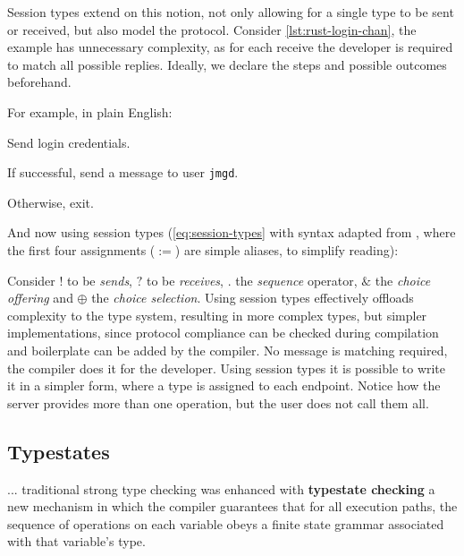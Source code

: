 

Session types extend on this notion, not only allowing for a single type to be sent or received,
but also model the protocol.
Consider \autoref{lst:rust-login-chan}, the example has unnecessary complexity,
as for each receive the developer is required to match all possible replies.
Ideally, we declare the steps and possible outcomes beforehand.

For example, in plain English:
\begin{compactenum}
    \item Send login credentials.
    \item If successful, send a message to user \texttt{jmgd}.
    \item Otherwise, exit.
\end{compactenum}

And now using session types (\autoref{eq:session-types}
with syntax adapted from \autocite{Vasconcelos2006},
where the first four assignments ($:=$) are simple aliases, to simplify reading):



Consider $!$ to be \emph{sends}, $?$ to be \emph{receives}, $.$ the \emph{sequence} operator,
$\&$ the \emph{choice offering} and $\oplus$ the \emph{choice selection}.
Using session types effectively offloads complexity to the type system,
resulting in more complex types, but simpler implementations,
since protocol compliance can be checked during compilation and boilerplate can be added by the compiler.
No message is matching required, the compiler does it for the developer.
Using session types it is possible to write it in a simpler form, where a type is assigned to each endpoint.
Notice how the server provides more than one operation, but the user does not call them all.

\subsection{Typestates}\label{sec:typestates}

\begin{displayquote}
    ... traditional strong type checking was enhanced with \textbf{typestate checking}
    a new mechanism in which the compiler guarantees that for all execution paths,
    the sequence of operations on each variable obeys a finite state grammar associated with that variable's type.
\end{displayquote}

